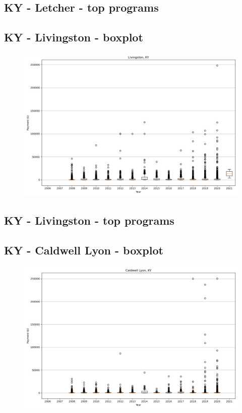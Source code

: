 \subsection*{KY - Letcher - top programs}

\newpage
\subsection*{KY - Livingston - boxplot}
\begin{figure}[h]
\centering
\includegraphics[width=7in]{../output/boxplots/counties/Livingston-KY_boxplot.png}
\end{figure}


\subsection*{KY - Livingston - top programs}

\newpage
\subsection*{KY - Caldwell Lyon - boxplot}
\begin{figure}[h]
\centering
\includegraphics[width=7in]{../output/boxplots/counties/Caldwell Lyon-KY_boxplot.png}
\end{figure}


